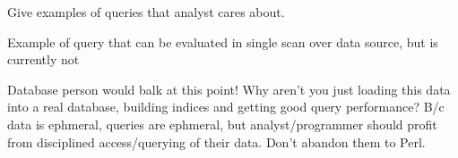 Give examples of queries that analyst cares about. 

Example of query that can be evaluated in single scan over data
source, but is currently not 

Database person would balk at this point!  Why aren't you just loading
this data into a real database, building indices and getting good
query performance?  B/c data is ephmeral, queries are ephmeral, but
analyst/programmer should profit from disciplined access/querying of
their data.  Don't abandon them to Perl. 

\cut{








}